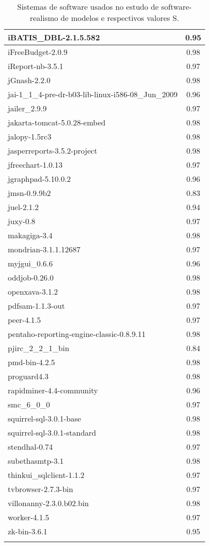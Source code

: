 \begin{center}
\begin{longtable}{| p{10cm} | c |}
	iBATIS\_DBL-2.1.5.582 & 0.95 \\ \hline
	iFreeBudget-2.0.9 & 0.98 \\ \hline
	iReport-nb-3.5.1 & 0.97 \\ \hline
	jGnash-2.2.0 & 0.98 \\ \hline
	jai-1\_1\_4-pre-dr-b03-lib-linux-i586-08\_Jun\_2009 & 0.96 \\ \hline
	jailer\_2.9.9 & 0.97 \\ \hline
	jakarta-tomcat-5.0.28-embed & 0.98 \\ \hline
	jalopy-1.5rc3 & 0.98 \\ \hline
	jasperreports-3.5.2-project & 0.98 \\ \hline
	jfreechart-1.0.13 & 0.97 \\ \hline
	jgraphpad-5.10.0.2 & 0.96 \\ \hline
	jmsn-0.9.9b2 & 0.83 \\ \hline
	juel-2.1.2 & 0.94 \\ \hline
	juxy-0.8 & 0.97 \\ \hline
	makagiga-3.4 & 0.98 \\ \hline
	mondrian-3.1.1.12687 & 0.97 \\ \hline
	myjgui\_0.6.6 & 0.96 \\ \hline
	oddjob-0.26.0 & 0.98 \\ \hline
	openxava-3.1.2 & 0.98 \\ \hline
	pdfsam-1.1.3-out & 0.97 \\ \hline
	peer-4.1.5 & 0.97 \\ \hline
	pentaho-reporting-engine-classic-0.8.9.11 & 0.98 \\ \hline
	pjirc\_2\_2\_1\_bin & 0.84 \\ \hline
	pmd-bin-4.2.5 & 0.98 \\ \hline
	proguard4.3 & 0.98 \\ \hline
	rapidminer-4.4-community & 0.96 \\ \hline
	smc\_6\_0\_0 & 0.97 \\ \hline
	squirrel-sql-3.0.1-base & 0.98 \\ \hline
	squirrel-sql-3.0.1-standard & 0.98 \\ \hline
	stendhal-0.74 & 0.97 \\ \hline
	subethasmtp-3.1 & 0.98 \\ \hline
	thinkui\_sqlclient-1.1.2 & 0.97 \\ \hline
	tvbrowser-2.7.3-bin & 0.97 \\ \hline
	villonanny-2.3.0.b02.bin & 0.98 \\ \hline
	worker-4.1.5 & 0.97 \\ \hline
	zk-bin-3.6.1 &  0.95 \\ \hline
	
	\caption{\label{tab:redes}Sistemas de software usados no estudo de software-realismo de modelos e respectivos valores S.}
\end{longtable}
\end{center}


